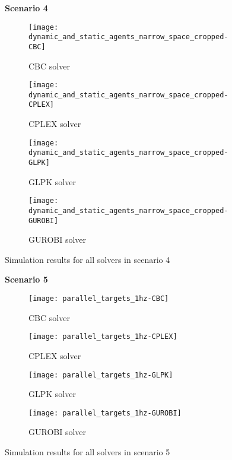 \begin{figure}[H]
    \centering
    \textbf{Scenario 4}\par \medskip
    \begin{subfigure}{0.49\textwidth}
        \centering
        \texttt{[image: dynamic\_and\_static\_agents\_narrow\_space\_cropped-CBC]}
        \caption{CBC solver}
    \end{subfigure}
    \begin{subfigure}{0.49\textwidth}
        \centering
        \texttt{[image: dynamic\_and\_static\_agents\_narrow\_space\_cropped-CPLEX]}
        \caption{CPLEX solver}
    \end{subfigure}
    \begin{subfigure}{0.49\textwidth}
        \centering
        \texttt{[image: dynamic\_and\_static\_agents\_narrow\_space\_cropped-GLPK]}
        \caption{GLPK solver}
    \end{subfigure}
    \begin{subfigure}{0.49\textwidth}
        \centering
        \texttt{[image: dynamic\_and\_static\_agents\_narrow\_space\_cropped-GUROBI]}
        \caption{GUROBI solver}
    \end{subfigure}
    \caption{Simulation results for all solvers in scenario 4}
	\label{fig:dynamic_and_static_agents_narrow_space_cropped}
\end{figure}

\begin{figure}[H]
    \centering
    \textbf{Scenario 5}\par \medskip
    \begin{subfigure}{0.49\textwidth}
        \centering
        \texttt{[image: parallel\_targets\_1hz-CBC]}
        \caption{CBC solver}
    \end{subfigure}
    \begin{subfigure}{0.49\textwidth}
        \centering
        \texttt{[image: parallel\_targets\_1hz-CPLEX]}
        \caption{CPLEX solver}
    \end{subfigure}
    \begin{subfigure}{0.49\textwidth}
        \centering
        \texttt{[image: parallel\_targets\_1hz-GLPK]}
        \caption{GLPK solver}
    \end{subfigure}
    \begin{subfigure}{0.49\textwidth}
        \centering
        \texttt{[image: parallel\_targets\_1hz-GUROBI]}
        \caption{GUROBI solver}
    \end{subfigure}
    \caption{Simulation results for all solvers in scenario 5}
    \label{fig:parallel_targets_1hz}
\end{figure} 

